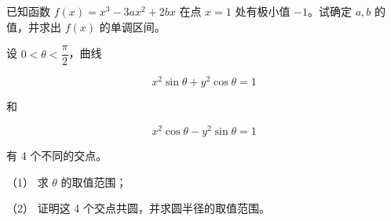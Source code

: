 \begin{question}
已知函数 $f(x)=x^3-3ax^2+2bx$ 在点 $x=1$ 处有极小值 $-1$。试确定 $a,b$ 的值，并求出 $f(x)$ 的单调区间。

\end{question}
\begin{question}
设 $0<\theta<\dfrac\pi2$，曲线

\nopagebreak[4]
\[
x^2\sin\theta+y^2\cos\theta=1
\]

和

\nopagebreak[4]
\[
x^2\cos\theta-y^2\sin\theta=1
\]

有 4 个不同的交点。

（1） 求 $\theta$ 的取值范围；

（2） 证明这 4 个交点共圆，并求圆半径的取值范围。

\end{question}